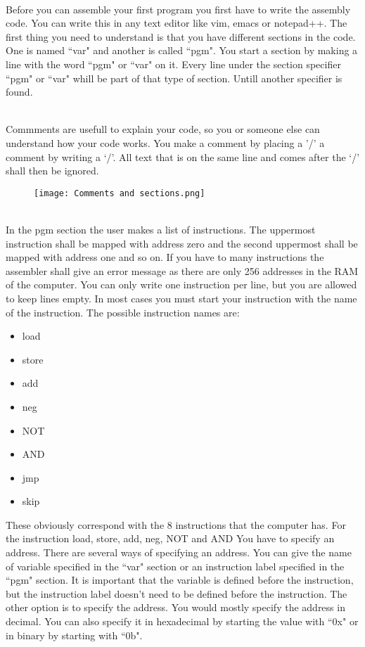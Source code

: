 \documentclass{article}
\begin{document}
~\\
Before you can assemble your first program you first have to write the assembly code. You can write this in any text editor like vim, emacs or notepad++. The first thing you need to understand is that you have different sections in the code. One is named ``var" and another is called ``pgm". You start a section by making a line with the word ``pgm" or ``var" on it. Every line under the section specifier ``pgm" or ``var" whill be part of that type of section. Untill another specifier is found.

~\\
Commments are usefull to explain your code, so you or someone else can understand how your code works. You make a comment by placing a '/' a comment by writing a ‘/’. All text that is on the same line and comes after the ‘/’ shall then be ignored.
\begin{figure}[H]
	\texttt{[image: Comments and sections.png]}
\end{figure}
~\\
In the pgm section the user makes a list of instructions. The uppermost instruction shall be mapped with address zero and the second uppermost shall be mapped with address one and so on. If you have to many instructions the assembler shall give an error message as there are only 256 addresses in the RAM of the computer. You can only write one instruction per line, but you are allowed to keep lines empty. In most cases you must start your instruction with the name of the instruction. The possible instruction names are:
\begin{itemize}
	\item{load}
	\item{store}
	\item{add}
	\item{neg}
	\item{NOT}
	\item{AND}
	\item{jmp}
	\item{skip}
\end{itemize}
These obviously correspond with the 8 instructions that the computer has. For the instruction load, store, add, neg, NOT and AND You have to specify an address. There are several ways of specifying an address. You can give the name of variable specified in the ``var" section or an instruction label specified in the ``pgm" section. It is important that the variable is defined before the instruction, but the instruction label doesn't need to be defined before the instruction. The other option is to specify the address. You would mostly specify the address in decimal. You can also specify it in hexadecimal by starting the value with  ``0x" or in binary by starting with ``0b".
\end{document}
